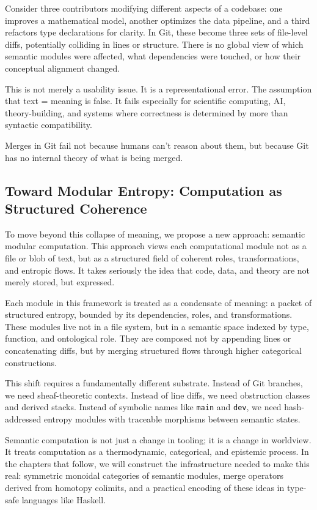 \documentclass[12pt]{article}
\begin{document}
Consider three contributors modifying different aspects of a codebase: one improves a mathematical model, another optimizes the data pipeline, and a third refactors type declarations for clarity. In Git, these become three sets of file-level diffs, potentially colliding in lines or structure. There is no global view of which semantic modules were affected, what dependencies were touched, or how their conceptual alignment changed.

This is not merely a usability issue. It is a representational error. The assumption that text = meaning is false. It fails especially for scientific computing, AI, theory-building, and systems where correctness is determined by more than syntactic compatibility.

Merges in Git fail not because humans can’t reason about them, but because Git has no internal theory of what is being merged.

\subsection{Toward Modular Entropy: Computation as Structured Coherence}
To move beyond this collapse of meaning, we propose a new approach: semantic modular computation. This approach views each computational module not as a file or blob of text, but as a structured field of coherent roles, transformations, and entropic flows. It takes seriously the idea that code, data, and theory are not merely stored, but expressed.

Each module in this framework is treated as a condensate of meaning: a packet of structured entropy, bounded by its dependencies, roles, and transformations. These modules live not in a file system, but in a semantic space indexed by type, function, and ontological role. They are composed not by appending lines or concatenating diffs, but by merging structured flows through higher categorical constructions.

This shift requires a fundamentally different substrate. Instead of Git branches, we need sheaf-theoretic contexts. Instead of line diffs, we need obstruction classes and derived stacks. Instead of symbolic names like \texttt{main} and \texttt{dev}, we need hash-addressed entropy modules with traceable morphisms between semantic states.

Semantic computation is not just a change in tooling; it is a change in worldview. It treats computation as a thermodynamic, categorical, and epistemic process. In the chapters that follow, we will construct the infrastructure needed to make this real: symmetric monoidal categories of semantic modules, merge operators derived from homotopy colimits, and a practical encoding of these ideas in type-safe languages like Haskell.
\end{document}
